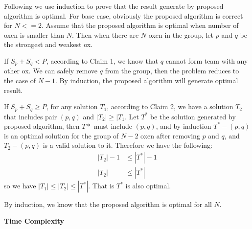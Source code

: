 \documentclass{article}
\newcommand{\Complexity}{\vspace{0.3cm} \noindent\textbf{Time Complexity} \\}
\begin{document}
\vspace{0.3cm}
Following we use induction to prove that the result generate by proposed algorithm is optimal.
For base case, obviously the proposed algorithm is correct for $N <= 2$.  
Assume that the proposed algorithm is optimal when number of oxen is smaller than $N$. Then when
there are $N$ oxen in the group, let $p$ and $q$ be the strongest and weakest ox.

If $S_p + S_q < P$, according to Claim 1, we know that $q$ cannot form team with any other ox. We
can safely remove $q$ from the group, then the problem reduces to the case of $N-1$. By induction,
the proposed algorithm will generate optimal result.

If $S_p + S_q \geq P$, for any solution $T_1$, according to Claim 2, we have a solution $T_2$ that
includes pair $(p, q)$ and $|T_2| \geq |T_1$. Let $T^*$ be the solution generated by proposed
algorithm, then $T*$ must include $(p, q)$, and by induction $T^* - (p, q)$ is an optimal solution for the group
of $N-2$ oxen after removing $p$ and $q$, and $T_2 - (p, q)$ is a valid solution to it. Therefore we
have the following:
\begin{align}
  |T_2| - 1 & \leq |T^*| - 1 \\
  |T_2| & \leq |T^*|
\end{align}
so we have $|T_1| \leq |T_2| \leq |T^*|$. That is $T^*$ is also optimal.

By induction, we know that the proposed algorithm is optimal for all $N$.

\Complexity
\end{document}
